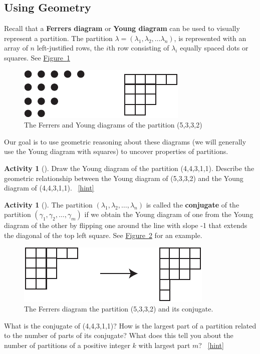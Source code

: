 \documentclass[10pt,]{book}
\newcommand{\terminology}[1]{\textbf{#1}}
\theoremstyle{plain}
\theoremstyle{definition}
\theoremstyle{definition}
\theoremstyle{definition}
\newtheorem{activity}[project]{Activity}
\numberwithin{equation}{chapter}
\begin{document}
\subsection[{Using Geometry}]{Using Geometry}\label{subsec_linearpartitionsgeom}
\hypertarget{p-1088}{}%
Recall that a \terminology{Ferrers diagram} or \terminology{Young diagram} can be used to visually represent a partition.  The partition \(\lambda = (\lambda_1,\lambda_2,\ldots \lambda_n)\), is represented with an array of \(n\) left-justified rows, the \(i\)th row consisting of \(\lambda_i\) equally spaced dots or squares.  See \hyperref[FerrersYoung-repeat]{Figure~\ref{FerrersYoung-repeat}}%
\begin{figure}
\centering
\includegraphics[width=0.45\linewidth]{images/FerrersYoung}
\caption{The Ferrers and Young diagrams of the partition (5,3,3,2)\label{FerrersYoung-repeat}}
\end{figure}
\hypertarget{p-1089}{}%
Our goal is to use geometric reasoning about these diagrams (we will generally use the Young diagram with squares) to uncover properties of partitions.%
\begin{activity}[]\label{activity-241}
\hypertarget{p-1090}{}%
Draw the Young diagram of the partition (4,4,3,1,1). Describe the geometric relationship between the Young diagram of (5,3,3,2) and the Young diagram of (4,4,3,1,1).%
~\hfill{\tiny\hyperlink{a-241}{[hint]}\hypertarget{q-241}{}}\end{activity}
\begin{activity}[]\label{activity-242}
\hypertarget{p-1093}{}%
The partition \((\lambda_1,\lambda_2,\ldots, \lambda_n)\) is called the \terminology{conjugate} of the partition \((\gamma_1,\gamma_2,\ldots, \gamma_m)\) if we obtain the Young diagram of one from the Young diagram of the other by flipping one around the line with slope -1 that extends the diagonal of the top left square. See \hyperref[conjugateYoung]{Figure~\ref{conjugateYoung}} for an example.%
\begin{figure}
\centering
\includegraphics[width=0.5\linewidth]{images/conjugateYoung}
\caption{The Ferrers diagram the partition (5,3,3,2) and its conjugate.\label{conjugateYoung}}
\end{figure}
\hypertarget{p-1094}{}%
What is the conjugate of (4,4,3,1,1)? How is the largest part of a partition related to the number of parts of its conjugate? What does this tell you about the number of partitions of a positive integer \(k\) with largest part \(m\)?%
~\hfill{\tiny\hyperlink{a-242}{[hint]}\hypertarget{q-242}{}}\end{activity}
\end{document}
